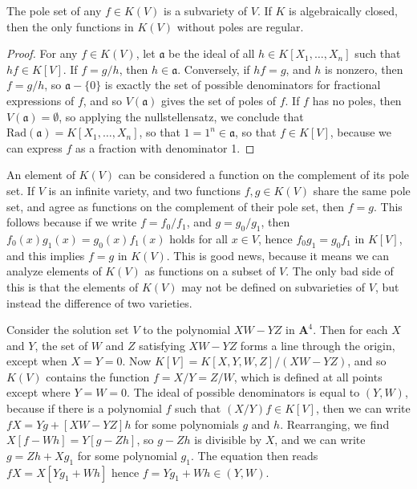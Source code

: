 \begin{prop}
    The pole set of any $f \in K(V)$ is a subvariety of $V$. If $K$ is algebraically closed, then the only functions in $K(V)$ without poles are regular.
\end{prop}
\begin{proof}
    For any $f \in K(V)$, let $\mathfrak{a}$ be the ideal of all $h \in K[X_1, \dots, X_n]$ such that $hf \in K[V]$. If $f = g/h$, then $h \in \mathfrak{a}$. Conversely, if $hf = g$, and $h$ is nonzero, then $f = g/h$, so $\mathfrak{a} - \{ 0 \}$ is exactly the set of possible denominators for fractional expressions of $f$, and so $V(\mathfrak{a})$ gives the set of poles of $f$. If $f$ has no poles, then $V(\mathfrak{a}) = \emptyset$, so applying the nullstellensatz, we conclude that $\text{Rad}(\mathfrak{a}) = K[X_1, \dots, X_n]$, so that $1 = 1^n \in \mathfrak{a}$, so that $f \in K[V]$, because we can express $f$ as a fraction with denominator 1.
\end{proof}

An element of $K(V)$ can be considered a function on the complement of its pole set. If $V$ is an infinite variety, and two functions $f,g \in K(V)$ share the same pole set, and agree as functions on the complement of their pole set, then $f = g$. This follows because if we write $f = f_0/f_1$, and $g = g_0/g_1$, then $f_0(x) g_1(x) = g_0(x) f_1(x)$ holds for all $x \in V$, hence $f_0g_1 = g_0f_1$ in $K[V]$, and this implies $f = g$ in $K(V)$. This is good news, because it means we can analyze elements of $K(V)$ as functions on a subset of $V$. The only bad side of this is that the elements of $K(V)$ may not be defined on subvarieties of $V$, but instead the difference of two varieties.

\begin{example}
    Consider the solution set $V$ to the polynomial $XW - YZ$ in $\mathbf{A}^4$. Then for each $X$ and $Y$, the set of $W$ and $Z$ satisfying $XW - YZ$ forms a line through the origin, except when $X = Y = 0$. Now $K[V] = K[X,Y,W,Z]/(XW - YZ)$, and so $K(V)$ contains the function $f = X/Y = Z/W$, which is defined at all points except where $Y = W = 0$. The ideal of possible denominators is equal to $(Y,W)$, because if there is a polynomial $f$ such that $(X/Y)f\in K[V]$, then we can write $fX = Yg + [XW - YZ]h$ for some polynomials $g$ and $h$. Rearranging, we find $X[f-Wh] = Y[g-Zh]$, so $g - Zh$ is divisible by $X$, and we can write $g = Zh + Xg_1$ for some polynomial $g_1$. The equation then reads $fX = X[Yg_1 + Wh]$ hence $f = Yg_1 + Wh \in (Y,W)$.
\end{example}

